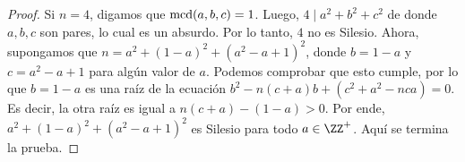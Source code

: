 \begin{proof}
  Si $n=4$, digamos que $\operatorname{mcd}(a,b,c)=1$. Luego, $4\mid a^2+b^2+c^2$ de donde
  $a,b,c$ son pares, lo cual es un absurdo. Por lo tanto, $4$ no es Silesio.
  Ahora, supongamos que $n=a^2+(1-a)^2+(a^2-a+1)^2$, donde $b=1-a$ y $c=a^2-a+1$
  para algún valor de $a$. Podemos comprobar que esto cumple, por lo que $b=1-a$
  es una raíz de la ecuación $b^2-n(c+a)b+(c^2+a^2-nca)=0$. Es decir, la otra
  raíz es igual a $n(c+a)-(1-a)>0$. Por ende, $a^2+(1-a)^2+(a^2-a+1)^2$ es
  Silesio para todo $a\in\ZZ^+$. Aquí se termina la prueba.
\end{proof}
